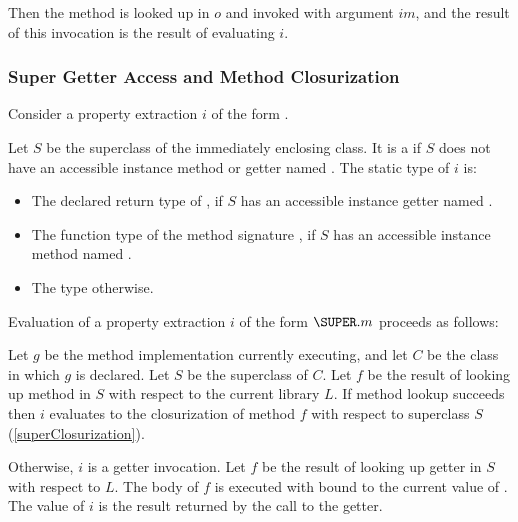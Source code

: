 \documentclass[makeidx]{article}
\begin{document}
{\LMHash{}%
Then the method  is looked up
in $o$ and invoked with argument $im$,
and the result of this invocation is the result of evaluating $i$.



\subsubsection{Super Getter Access and Method Closurization}

\LMHash{}%
Consider a property extraction $i$ of the form .

\LMHash{}%
Let $S$ be the superclass of the immediately enclosing class.
It is a  if $S$ does not have
an accessible instance method or getter named \id.
The static type of $i$ is:

\begin{itemize}
\item The declared return type of ,
  if $S$ has an accessible instance getter named \id.
\item The function type of the method signature ,
  if $S$ has an accessible instance method named \id.
\item The type \DYNAMIC{} otherwise.
\end{itemize}


\LMHash{}%
Evaluation of a property extraction $i$ of the form $\SUPER.m$
proceeds as follows:

\LMHash{}%
Let $g$ be the method implementation currently executing,
and let $C$ be the class in which $g$ is declared.
Let $S$ be the superclass of $C$.
Let $f$ be the result of looking up method \id{} in $S$
with respect to the current library $L$.
If method lookup succeeds then $i$ evaluates to
the closurization of method $f$
with respect to superclass $S$
(\ref{superClosurization}).

\LMHash{}%
Otherwise, $i$ is a getter invocation.
Let $f$ be the result of looking up
getter \id{} in $S$ with respect to $L$.
The body of $f$ is executed with \THIS{} bound to the current value of \THIS.
The value of $i$ is the result returned by the call to the getter.

}
\end{document}
